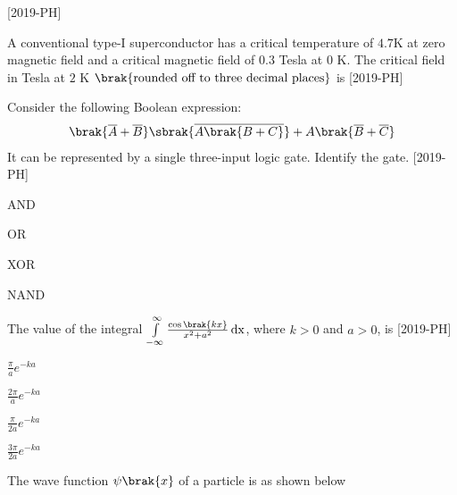     \hfill{[2019-PH]}\\
\item A conventional type-I superconductor has a critical temperature of $4.7$K at zero magnetic field and a critical magnetic field of $0.3$ Tesla at $0$ K. The critical field in Tesla at $2$ K
$\brak{\text{rounded off to three decimal places}}$ is \underline{\hspace{1cm}} \hfill{[2019-PH]}\\
\item Consider the following Boolean expression:\\
\begin{align*}
    \brak{\overline{A}+\overline{B}} \sbrak{\overline{A \brak{B+C}}} + A\brak{\overline{B}+\overline{C}}
\end{align*}
It can be represented by a single three-input logic gate. Identify the gate. \hfill{[2019-PH]}\\
\begin{enumerate}
\begin{multicols}{4}
\item AND
\item OR
\item XOR
\item NAND
\end{multicols}
\end{enumerate}
\item The value of the integral $\int \limits_{-\infty}^{\infty} \frac{\cos \brak{kx}}{x^2+a^2}\, \text{dx}$, where $k>0$ and $a>0$, is \hfill{[2019-PH]}\\
\begin{enumerate}
\begin{multicols}{4}
\item $\frac{\pi}{a} e^{-ka}$
\item $\frac{2\pi}{a} e^{-ka}$
\item $\frac{\pi}{2a} e^{-ka}$
\item $\frac{3\pi}{2a} e^{-ka}$
\end{multicols}
\end{enumerate}
\item The wave function $\psi\brak{x}$ of a particle is as shown below\\
